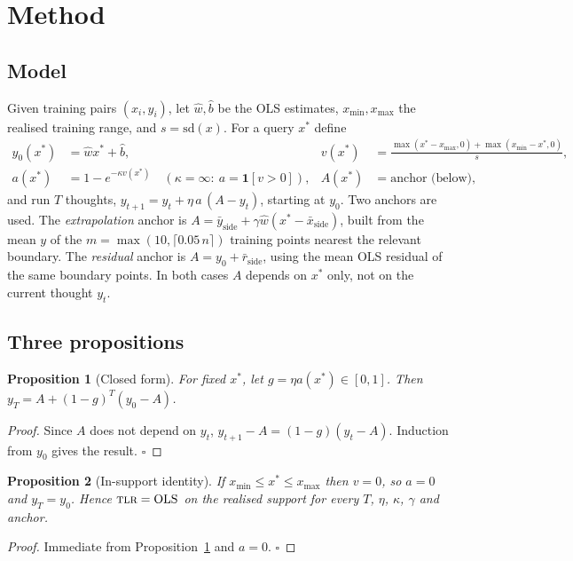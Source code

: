 \documentclass[10pt]{article}
\newtheorem{proposition}{Proposition}
\newcommand{\TLR}{\textsc{tlr}}
\begin{document}
\section{Method}
\label{sec:method}
\subsection{Model}
Given training pairs $(x_i,y_i)$, let $\hat w,\hat b$ be the OLS estimates, $x_{\min},x_{\max}$ the realised training range, and $s=\mathrm{sd}(x)$. For a query $x^*$ define
\begin{align}
y_0(x^*) &= \hat w x^* + \hat b, &
v(x^*) &= \frac{\max(x^*-x_{\max},0)+\max(x_{\min}-x^*,0)}{s},\\
a(x^*) &= 1-e^{-\kappa v(x^*)}\quad(\kappa=\infty:\ a=\mathbf 1[v>0]), &
A(x^*) &= \text{anchor (below)},
\end{align}
and run $T$ thoughts, $y_{t+1}=y_t+\eta\,a\,(A-y_t)$, starting at $y_0$. Two anchors are used. The \emph{extrapolation} anchor is $A=\bar y_{\mathrm{side}}+\gamma\hat w(x^*-\bar x_{\mathrm{side}})$, built from the mean $y$ of the $m=\max(10,\lceil 0.05\,n\rceil)$ training points nearest the relevant boundary. The \emph{residual} anchor is $A=y_0+\bar r_{\mathrm{side}}$, using the mean OLS residual of the same boundary points. In both cases $A$ depends on $x^*$ only, not on the current thought $y_t$.

\subsection{Three propositions}
\begin{proposition}[Closed form]\label{prop:closed}
For fixed $x^*$, let $g=\eta a(x^*)\in[0,1]$. Then $y_T=A+(1-g)^T(y_0-A)$.
\end{proposition}
\begin{proof}
Since $A$ does not depend on $y_t$, $y_{t+1}-A=(1-g)(y_t-A)$. Induction from $y_0$ gives the result. $\square$
\end{proof}

\begin{proposition}[In-support identity]\label{prop:identity}
If $x_{\min}\le x^*\le x_{\max}$ then $v=0$, so $a=0$ and $y_T=y_0$. Hence $\TLR=\mathrm{OLS}$ on the realised support for every $T$, $\eta$, $\kappa$, $\gamma$ and anchor.
\end{proposition}
\begin{proof}
Immediate from Proposition~\ref{prop:closed} and $a=0$. $\square$
\end{proof}
\end{document}
